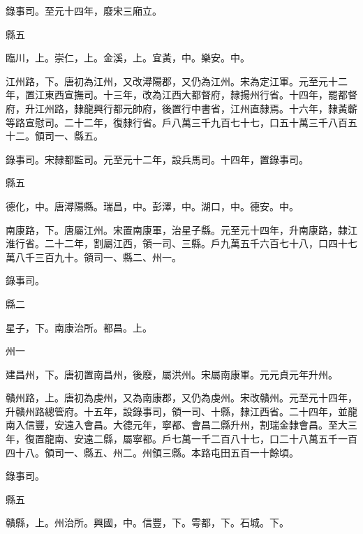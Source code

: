 \begin{pinyinscope}
 錄事司。至元十四年，廢宋三廂立。



 縣五



 臨川，上。崇仁，上。金溪，上。宜黃，中。樂安。中。



 江州路，下。唐初為江州，又改潯陽郡，又仍為江州。宋為定江軍。元至元十二年，置江東西宣撫司。十三年，改為江西大都督府，隸揚州行省。十四年，罷都督府，升江州路，隸龍興行都元帥府，後置行中書省，江州直隸焉。十六年，隸黃蘄等路宣慰司。二十二年，復隸行省。戶八萬三千九百七十七，口五十萬三千八百五十二。領司一、縣五。



 錄事司。宋隸都監司。元至元十二年，設兵馬司。十四年，置錄事司。



 縣五



 德化，中。唐潯陽縣。瑞昌，中。彭澤，中。湖口，中。德安。中。



 南康路，下。唐屬江州。宋置南康軍，治星子縣。元至元十四年，升南康路，隸江淮行省。二十二年，割屬江西，領一司、三縣。戶九萬五千六百七十八，口四十七萬八千三百九十。領司一、縣二、州一。



 錄事司。



 縣二



 星子，下。南康治所。都昌。上。



 州一



 建昌州，下。唐初置南昌州，後廢，屬洪州。宋屬南康軍。元元貞元年升州。



 贛州路，上。唐初為虔州，又為南康郡，又仍為虔州。宋改贛州。元至元十四年，升贛州路總管府。十五年，設錄事司，領一司、十縣，隸江西省。二十四年，並龍南入信豐，安遠入會昌。大德元年，寧都、會昌二縣升州，割瑞金隸會昌。至大三年，復置龍南、安遠二縣，屬寧都。戶七萬一千二百八十七，口二十八萬五千一百四十八。領司一、縣五、州二。州領三縣。本路屯田五百一十餘頃。



 錄事司。



 縣五



 贛縣，上。州治所。興國，中。信豐，下。雩都，下。石城。下。




\end{pinyinscope}
